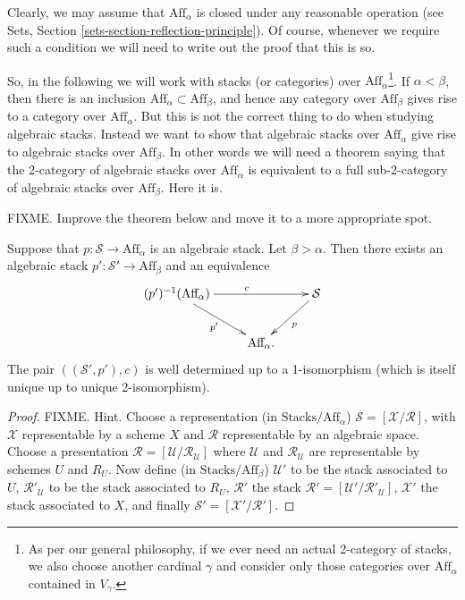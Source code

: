 \noindent
Clearly, we may assume that $\text{Aff}_\alpha$ is closed under any reasonable
operation (see Sets, Section \ref{sets-section-reflection-principle}).
Of course, whenever we require such a condition we will need to write out
the proof that this is so.

\smallskip\noindent
So, in the following we will work with stacks (or categories) over
$\text{Aff}_\alpha$\footnote{As per our general philosophy, if we ever need
an actual 2-category of stacks, we also choose another cardinal $\gamma$ and
consider only those categories over $\text{Aff}_\alpha$ contained in
$V_\gamma$.}. If $\alpha < \beta$, then there is an inclusion
$\text{Aff}_\alpha \subset \text{Aff}_\beta$, and hence any category
over $\text{Aff}_\beta$ gives rise to a category over $\text{Aff}_\alpha$.
But this is not the correct thing to do when studying algebraic stacks.
Instead we want to show that algebraic stacks over $\text{Aff}_\alpha$
give rise to algebraic stacks over $\text{Aff}_\beta$. In other words we will
need a theorem saying that the 2-category of algebraic
stacks over $\text{Aff}_\alpha$ is equivalent to a full sub-2-category of
algebraic stacks over $\text{Aff}_\beta$. Here it is.

\smallskip\noindent
FIXME. Improve the theorem below and move it to a more appropriate spot.

\begin{theorem}
\label{theorem-change-alpha}
Suppose that $p : \mathcal{S} \to \text{Aff}_\alpha$ is an algebraic stack.
Let $\beta > \alpha$. Then there exists an algebraic stack
$p' : \mathcal{S}' \to \text{Aff}_\beta$ and an equivalence
$$
\xymatrix{
(p')^{-1}(\text{Aff}_\alpha) \ar[rd]_{p'} \ar[rr]^c && \mathcal{S}\ar[ld]^p\\
&\text{Aff}_\alpha.&}
$$
The pair $((\mathcal{S'},p'),c)$ is well determined up to a 1-isomorphism
(which is itself unique up to unique 2-isomorphism).
\end{theorem}

\begin{proof}
FIXME. Hint. Choose a representation (in $\text{Stacks}/\text{Aff}_\alpha$)
$\mathcal{S} = [ \mathcal{X}/\mathcal{R} ]$, with $\mathcal{X}$ representable
by a scheme $X$ and $\mathcal{R}$ representable by an algebraic space.
Choose a presentation $\mathcal{R} = [ \mathcal{U}/\mathcal{R}_\mathcal{U} ]$
where $\mathcal{U}$ and $\mathcal{R}_\mathcal{U}$ are representable
by schemes $U$ and $R_U$. Now define (in $\text{Stacks}/\text{Aff}_\beta$)
$\mathcal{U}'$ to be the stack associated to $U$, $\mathcal{R}'_\mathcal{U}$
to be the stack associated to $R_U$, $\mathcal{R}'$ the stack
$\mathcal{R}' = [ \mathcal{U}'/\mathcal{R}'_\mathcal{U} ]$, $\mathcal{X}'$
the stack associated to $X$, and finally
$\mathcal{S}' = [ \mathcal{X}'/\mathcal{R}' ]$.
\end{proof}

